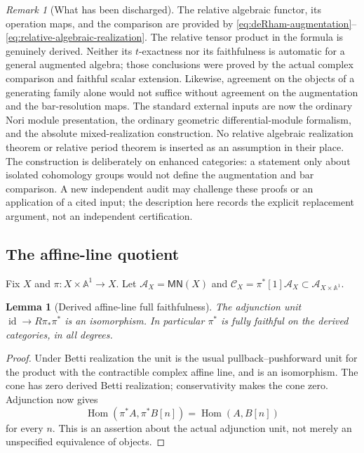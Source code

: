 \documentclass[11pt]{article}
\numberwithin{equation}{section}
\newtheorem{lemma}[lemma]{Lemma}
\theoremstyle{definition}
\theoremstyle{remark}
\newtheorem{remark}[remark]{Remark}
\newcommand{\A}{\mathbb A}
\newcommand{\Ccal}{\mathcal C}
\newcommand{\MN}{\mathsf{MN}}
\newcommand{\Hom}{\operatorname{Hom}}
\newcommand{\id}{\operatorname{id}}
\begin{document}
\begin{remark}[What has been discharged]\label{rem:interface-discharge}
The relative algebraic functor, its operation maps, and the comparison are
provided by \eqref{eq:deRham-augmentation}--\eqref{eq:relative-algebraic-realization}.
The relative tensor product in the formula is genuinely derived.
Neither its $t$-exactness nor its faithfulness is automatic for a general
augmented algebra; those conclusions were proved by the actual complex
comparison and faithful scalar extension. Likewise, agreement on the
objects of a generating family alone would not suffice without agreement
on the augmentation and the bar-resolution maps.
The standard external inputs are now the ordinary Nori module presentation,
the ordinary geometric differential-module formalism, and the absolute
mixed-realization construction. No relative algebraic realization theorem
or relative period theorem is inserted as an assumption in their place.
The construction is deliberately on enhanced categories: a statement only
about isolated cohomology groups would not define the augmentation and
bar comparison. A new independent audit may challenge these proofs or an
application of a cited input; the description here records the explicit
replacement argument, not an independent certification.
\end{remark}

\subsection{The affine-line quotient}

Fix $X$ and $\pi:X\times\A^1\to X$. Let
$\mathcal A_X=\MN(X)$ and
$\Ccal_X=\pi^*[1]\mathcal A_X\subset\mathcal A_{X\times\A^1}$.

\begin{lemma}[Derived affine-line full faithfulness]\label{lem:affine-ff}
The adjunction unit $\id\to R\pi_*\pi^*$ is an isomorphism. In particular
$\pi^*$ is fully faithful on the derived categories, in all degrees.
\end{lemma}
\begin{proof}
Under Betti realization the unit is the usual pullback--pushforward unit
for the product with the contractible complex affine line, and is an
isomorphism. The cone has zero derived Betti realization; conservativity
makes the cone zero. Adjunction now gives
\[
 \Hom(\pi^*A,\pi^*B[n])=\Hom(A,B[n])
\]
for every $n$. This is an assertion about the actual adjunction unit, not
merely an unspecified equivalence of objects.
\end{proof}
\end{document}
